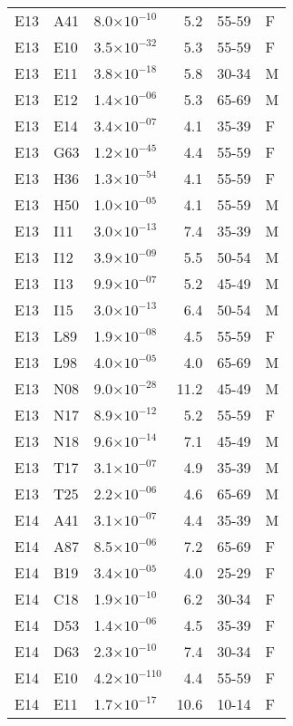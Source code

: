 \begin{longtable}{lllrll}
   E13 & A41 & 8.0$\times10^{-10}$ & 5.2 & 55-59 & F \\ 
   E13 & E10 & 3.5$\times10^{-32}$ & 5.3 & 55-59 & F \\ 
   E13 & E11 & 3.8$\times10^{-18}$ & 5.8 & 30-34 & M \\ 
   E13 & E12 & 1.4$\times10^{-06}$ & 5.3 & 65-69 & M \\ 
   E13 & E14 & 3.4$\times10^{-07}$ & 4.1 & 35-39 & F \\ 
   E13 & G63 & 1.2$\times10^{-45}$ & 4.4 & 55-59 & F \\ 
   E13 & H36 & 1.3$\times10^{-54}$ & 4.1 & 55-59 & F \\ 
   E13 & H50 & 1.0$\times10^{-05}$ & 4.1 & 55-59 & M \\ 
   E13 & I11 & 3.0$\times10^{-13}$ & 7.4 & 35-39 & M \\ 
   E13 & I12 & 3.9$\times10^{-09}$ & 5.5 & 50-54 & M \\ 
   E13 & I13 & 9.9$\times10^{-07}$ & 5.2 & 45-49 & M \\ 
   E13 & I15 & 3.0$\times10^{-13}$ & 6.4 & 50-54 & M \\ 
   E13 & L89 & 1.9$\times10^{-08}$ & 4.5 & 55-59 & F \\ 
   E13 & L98 & 4.0$\times10^{-05}$ & 4.0 & 65-69 & M \\ 
   E13 & N08 & 9.0$\times10^{-28}$ & 11.2 & 45-49 & M \\ 
   E13 & N17 & 8.9$\times10^{-12}$ & 5.2 & 55-59 & F \\ 
   E13 & N18 & 9.6$\times10^{-14}$ & 7.1 & 45-49 & M \\ 
   E13 & T17 & 3.1$\times10^{-07}$ & 4.9 & 35-39 & M \\ 
   E13 & T25 & 2.2$\times10^{-06}$ & 4.6 & 65-69 & M \\ 
   E14 & A41 & 3.1$\times10^{-07}$ & 4.4 & 35-39 & M \\ 
   E14 & A87 & 8.5$\times10^{-06}$ & 7.2 & 65-69 & F \\ 
   E14 & B19 & 3.4$\times10^{-05}$ & 4.0 & 25-29 & F \\ 
   E14 & C18 & 1.9$\times10^{-10}$ & 6.2 & 30-34 & F \\ 
   E14 & D53 & 1.4$\times10^{-06}$ & 4.5 & 35-39 & F \\ 
   E14 & D63 & 2.3$\times10^{-10}$ & 7.4 & 30-34 & F \\ 
   E14 & E10 & 4.2$\times10^{-110}$ & 4.4 & 55-59 & F \\ 
   E14 & E11 & 1.7$\times10^{-17}$ & 10.6 & 10-14 & F \\ 

\end{longtable}
